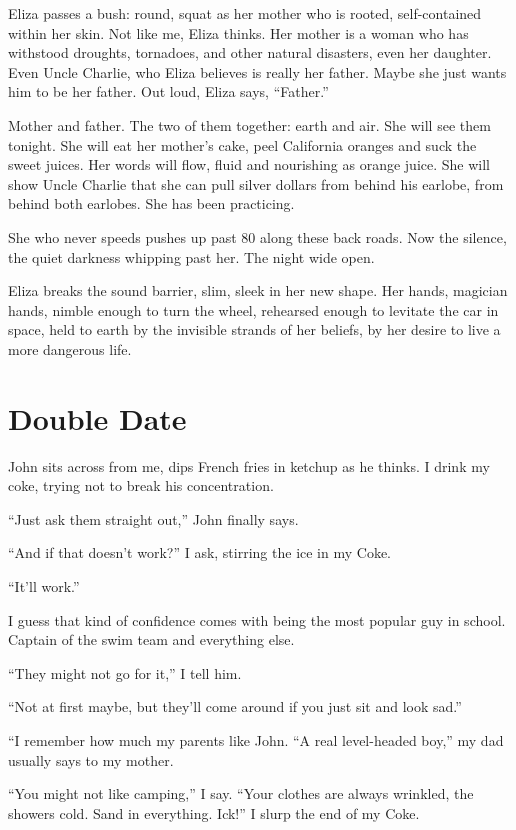 \documentclass[twoside,10pt]{book}
\begin{document}
Eliza passes a bush: round, squat as her mother who is rooted,
self-contained within her skin. Not like me, Eliza thinks. Her mother is
a woman who has withstood droughts, tornadoes, and other natural
disasters, even her daughter. Even Uncle Charlie, who Eliza believes is
really her father. Maybe she just wants him to be her father. Out loud,
Eliza says, ``Father.''

Mother and father. The two of them together: earth and air. She will see
them tonight. She will eat her mother's cake, peel California oranges
and suck the sweet juices. Her words will flow, fluid and nourishing as
orange juice. She will show Uncle Charlie that she can pull silver
dollars from behind his earlobe, from behind both earlobes. She has been
practicing.

She who never speeds pushes up past 80 along these back roads. Now the
silence, the quiet darkness whipping past her. The night wide open.

Eliza breaks the sound barrier, slim, sleek in her new shape. Her hands,
magician hands, nimble enough to turn the wheel, rehearsed enough to
levitate the car in space, held to earth by the invisible strands of her
beliefs, by her desire to live a more dangerous life.



\cleardoublepage
\chapter{Double Date}

John sits across from me, dips French fries in ketchup as he thinks. I
drink my coke, trying not to break his concentration.

``Just ask them straight out,'' John finally says.

``And if that doesn't work?'' I ask, stirring the ice in my Coke.

``It'll work.''

I guess that kind of confidence comes with being the most popular guy in
school. Captain of the swim team and everything else.

``They might not go for it,'' I tell him.

``Not at first maybe, but they'll come around if you just sit and look
sad.''

``I remember how much my parents like John. ``A real level-headed boy,''
my dad usually says to my mother.

``You might not like camping,'' I say. ``Your clothes are always
wrinkled, the showers cold. Sand in everything. Ick!'' I slurp the end
of my Coke.
\end{document}
